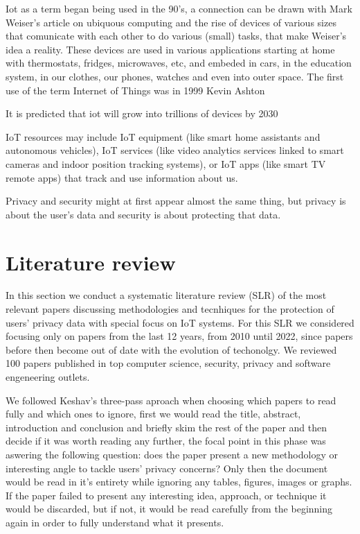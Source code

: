 \documentclass[conference]{IEEEtran}
\begin{document}
Iot as a term began being used in the 90's, a connection can be drawn
with Mark Weiser's article on ubiquous computing and the rise
of devices of various sizes that comunicate with each other to do
various (small) tasks, that make Weiser's idea a reality. These devices are
used in various applications starting at home with thermostats,
fridges, microwaves, etc, and embeded in cars, in the education system,
in our clothes, our phones, watches and even into outer space. The
first use of the term Internet of Things was in 1999  Kevin Ashton

It is predicted that iot will grow into trillions of devices by 2030 \cite{SarawiInternet}

IoT resources may include IoT equipment (like smart home assistants and
autonomous vehicles), IoT services (like video analytics services linked to
smart cameras and indoor position tracking systems), or IoT apps
(like smart TV remote apps) that track and use information about us.

Privacy and security might at first appear almost the same thing, but 
privacy is about the user's data and security is about protecting that data.

\section{Literature review}

In this section we conduct a systematic literature review (SLR) of the most relevant papers
discussing methodologies and tecnhiques for the protection of users' privacy data
with special focus on IoT systems. For this SLR we considered focusing only
on papers from the last 12 years, from 2010 until 2022, since papers before then
become out of date with the evolution of techonolgy. We reviewed 100 papers published
in top computer science, security, privacy and software engeneering outlets.

We followed Keshav's three-pass aproach \cite{KeshavHow} when choosing which
papers to read fully and which ones to ignore, first we would read the title, abstract,
introduction and conclusion and briefly skim the rest of the paper and then
decide if it was worth reading any further, the focal point in this phase was
aswering the following question: does the paper present a new methodology or
interesting angle to tackle users' privacy concerns? Only then the document would
be read in it's entirety while ignoring any tables, figures, images or graphs.
If the paper failed to present any interesting idea, approach, or
technique it would be discarded, but if not, it would be read carefully from
the beginning again in order to fully understand what it presents.
\end{document}
